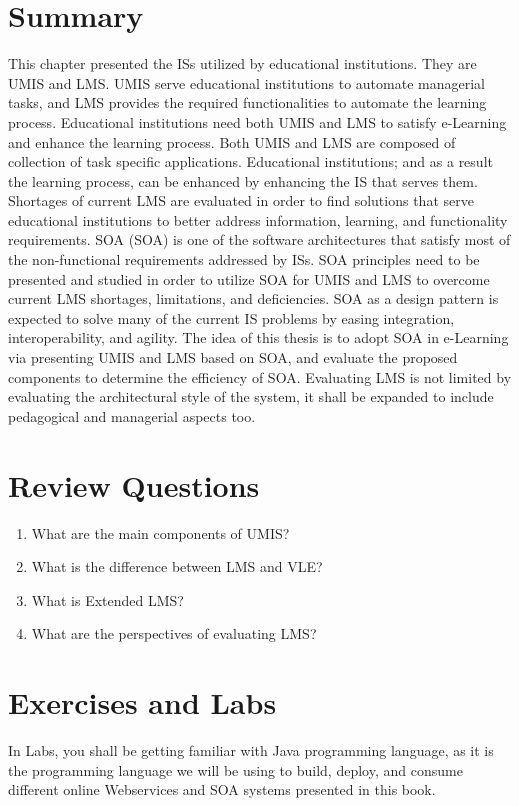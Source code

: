 \documentclass[12pt,a4paper,final,twoside,onecolumn,titlepage]{book}
\begin{document}
\section{Summary}
This chapter presented the \gls{IS}s utilized by educational institutions. They are \gls{UMIS} and \gls{LMS}. \gls{UMIS} serve educational institutions to automate managerial tasks, and \gls{LMS} provides the required functionalities to automate the learning process. Educational institutions need both \gls{UMIS} and \gls{LMS} to satisfy e-Learning and enhance the learning process. Both \gls{UMIS} and \gls{LMS} are composed of collection of task specific applications. Educational institutions; and as a result the learning process, can be enhanced by enhancing the \gls{IS} that serves them. Shortages of current \gls{LMS} are evaluated in order to find solutions that serve educational institutions to better address information, learning, and functionality requirements.
\gls{SOA} (\gls{SOA}) is one of the software architectures that satisfy most of the non-functional requirements addressed by \gls{IS}s. \gls{SOA} principles need to be presented and studied in order to utilize \gls{SOA} for \gls{UMIS} and \gls{LMS} to overcome current \gls{LMS} shortages, limitations, and deficiencies. \gls{SOA} as a design pattern is expected to solve many of the current \gls{IS} problems by easing integration, interoperability, and agility.
The idea of this thesis is to adopt \gls{SOA} in e-Learning via presenting \gls{UMIS} and \gls{LMS} based on \gls{SOA}, and evaluate the proposed components to determine the efficiency of \gls{SOA}. Evaluating \gls{LMS} is not limited by evaluating the architectural style of the system, it shall be expanded to include pedagogical and managerial aspects too.

\section{Review Questions}
\begin{enumerate}
\item What are the main components of \gls{UMIS}?
\item What is the difference between \gls{LMS} and \gls{VLE}?
\item What is Extended \gls{LMS}?
\item What are the perspectives of evaluating \gls{LMS}?
\end{enumerate}

\section{Exercises and Labs}
In Labs, you shall be getting familiar with Java programming language, as it is the programming language we will be using to build, deploy, and consume different online Webservices and \gls{SOA} systems presented in this book.
\end{document}
